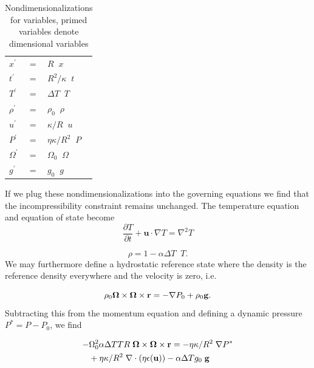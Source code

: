 \documentclass[extra,mreferee]{gji}
\begin{document}
\begin{table}
\centering
\caption{Nondimensionalizations for variables, primed variables denote dimensional variables}
\label{tab:nondim_convert}
\begin{tabular}{@{}lll}
$x^\prime$ &=& $R \;\; x$ \\
$t^\prime$ &=& $R^2/\kappa \;\; t$ \\
$T^\prime$ &=& $\Delta T \;\; T$ \\
$\rho^\prime$ &=& $\rho_0 \;\; \rho$\\
$u^\prime$ &=& $\kappa/R \;\; u$ \\
$P^\prime$ &=& $\eta \kappa/R^2 \;\; P$ \\
$\Omega^\prime$ &=& $\Omega_0 \;\; \Omega$ \\
$g^\prime$ &=& $g_0 \;\; g$
\end{tabular}
\end{table}

If we plug these nondimensionalizations into the governing equations we find that the incompressibility constraint remains unchanged.  
The temperature equation and equation of state become
\begin{equation}
\frac{\partial T}{\partial t} + \mathbf{u} \cdot \nabla T = \nabla^2 T
\end{equation}

\begin{equation}
\rho = 1 - \alpha \Delta T \;\;  T.
\end{equation}
We may furthermore define a hydrostatic reference state where the density is the reference density everywhere and the velocity is zero, i.e.

\begin{equation}
 \rho_0 \mitbf{\Omega} \times \mitbf{\Omega} \times \mathbf{r}= - \nabla P_0 + \rho_0 \mathbf{g}.
\end{equation}
Subtracting this from the momentum equation and defining a dynamic pressure $P^* = P - P_0$, we find

\begin{equation}
\begin{aligned}
 - & \Omega_0^2  \alpha  \Delta T T R \; \mitbf{\Omega} \times \mitbf{\Omega} \times \mathbf{r} = - \eta \kappa / R^2 \; \nabla P^* \\ 
&+ \eta \kappa / R^2 \; \nabla \cdot \left( \eta \epsilon (\mathbf{u}) \right) - \alpha \Delta T g_0 \; \mathbf{g}
\end{aligned}
\end{equation}
\end{document}
